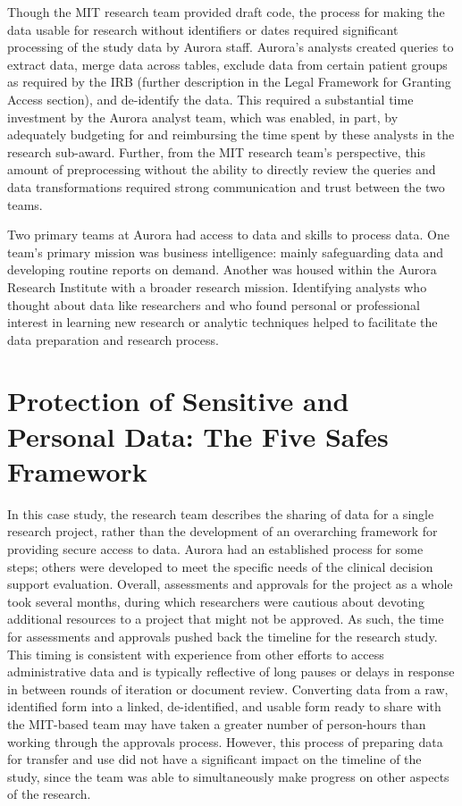 Though the MIT research team provided draft code, the process for making the data usable for research without identifiers or dates required significant processing of the study data by Aurora staff. Aurora's analysts created queries to extract data, merge data across tables, exclude data from certain patient groups as required by the IRB (further description in the Legal Framework for Granting Access section), and de-identify the data. This required a substantial time investment by the Aurora analyst team, which was enabled, in part, by adequately budgeting for and reimbursing the time spent by these analysts in the research sub-award. Further, from the MIT research team's perspective, this amount of preprocessing without the ability to directly review the queries and data transformations required strong communication and trust between the two teams.

Two primary teams at Aurora had access to data and skills to process data. One team's primary mission was business intelligence: mainly safeguarding data and developing routine reports on demand. Another was housed within the Aurora Research Institute with a broader research mission. Identifying analysts who thought about data like researchers and who found personal or professional interest in learning new research or analytic techniques helped to facilitate the data preparation and research process.

\hypertarget{protection-of-sensitive-and-personal-data-the-five-safes-framework-3}{%
\section{Protection of Sensitive and Personal Data: The Five Safes Framework}\label{protection-of-sensitive-and-personal-data-the-five-safes-framework-3}}

In this case study, the research team describes the sharing of data for a single research project, rather than the development of an overarching framework for providing secure access to data. Aurora had an established process for some steps; others were developed to meet the specific needs of the clinical decision support evaluation. Overall, assessments and approvals for the project as a whole took several months, during which researchers were cautious about devoting additional resources to a project that might not be approved. As such, the time for assessments and approvals pushed back the timeline for the research study. This timing is consistent with experience from other efforts to access administrative data and is typically reflective of long pauses or delays in response in between rounds of iteration or document review. Converting data from a raw, identified form into a linked, de-identified, and usable form ready to share with the MIT-based team may have taken a greater number of person-hours than working through the approvals process. However, this process of preparing data for transfer and use did not have a significant impact on the timeline of the study, since the team was able to simultaneously make progress on other aspects of the research.

